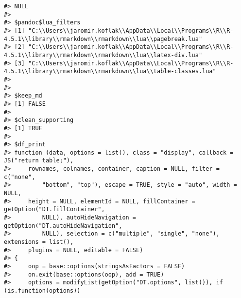 \documentclass[
]{book}
\begin{document}
\begin{verbatim}
#> NULL
#> 
#> $pandoc$lua_filters
#> [1] "C:\\Users\\jaromir.koflak\\AppData\\Local\\Programs\\R\\R-4.5.1\\library\\rmarkdown\\rmarkdown\\lua\\pagebreak.lua"    
#> [2] "C:\\Users\\jaromir.koflak\\AppData\\Local\\Programs\\R\\R-4.5.1\\library\\rmarkdown\\rmarkdown\\lua\\latex-div.lua"    
#> [3] "C:\\Users\\jaromir.koflak\\AppData\\Local\\Programs\\R\\R-4.5.1\\library\\rmarkdown\\rmarkdown\\lua\\table-classes.lua"
#> 
#> 
#> $keep_md
#> [1] FALSE
#> 
#> $clean_supporting
#> [1] TRUE
#> 
#> $df_print
#> function (data, options = list(), class = "display", callback = JS("return table;"), 
#>     rownames, colnames, container, caption = NULL, filter = c("none", 
#>         "bottom", "top"), escape = TRUE, style = "auto", width = NULL, 
#>     height = NULL, elementId = NULL, fillContainer = getOption("DT.fillContainer", 
#>         NULL), autoHideNavigation = getOption("DT.autoHideNavigation", 
#>         NULL), selection = c("multiple", "single", "none"), extensions = list(), 
#>     plugins = NULL, editable = FALSE) 
#> {
#>     oop = base::options(stringsAsFactors = FALSE)
#>     on.exit(base::options(oop), add = TRUE)
#>     options = modifyList(getOption("DT.options", list()), if (is.function(options)) 

\end{verbatim}
\end{document}
